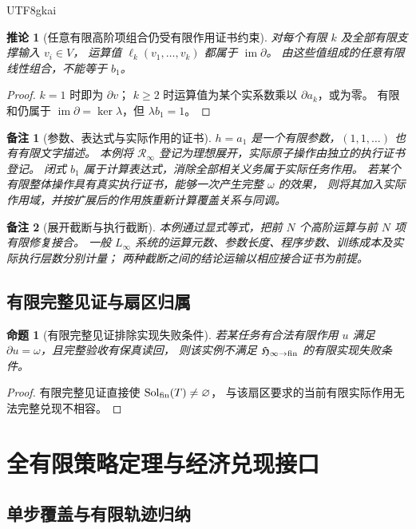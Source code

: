 \documentclass[12pt,a4paper,openany]{report}
\newtheorem{proposition}{命题}[chapter]
\newtheorem{corollary}{推论}[chapter]
\newtheorem{remark}{备注}[chapter]
\numberwithin{equation}{chapter}
\newcommand{\Linfty}{L_\infty}
\newcommand{\im}{\operatorname{im}}
\newcommand{\Sol}{\operatorname{Sol}}
\begin{document}
\begin{CJK*}{UTF8}{gkai}
\begin{corollary}[任意有限高阶项组合仍受有限作用证书约束]
对每个有限 $k$ 及全部有限支撑输入 $v_i\in V$，
运算值 $\ell_k(v_1,\ldots,v_k)$ 都属于 $\im\partial$。
由这些值组成的任意有限线性组合，不能等于 $b_1$。
\end{corollary}
\begin{proof}
$k=1$ 时即为 $\partial v$；
$k\ge2$ 时运算值为某个实系数乘以 $\partial a_k$，或为零。
有限和仍属于 $\im\partial=\ker\lambda$，但 $\lambda b_1=1$。
\end{proof}

\begin{remark}[参数、表达式与实际作用的证书]
$h=a_1$ 是一个有限参数，$(1,1,\ldots)$ 也有有限文字描述。
本例将 $\mathcal R_\infty$ 登记为理想展开，实际原子操作由独立的执行证书登记。
闭式 $b_1$ 属于计算表达式，消除全部相关义务属于实际任务作用。
若某个有限整体操作具有真实执行证书，能够一次产生完整 $\omega$ 的效果，
则将其加入实际作用域，并按扩展后的作用族重新计算覆盖关系与同调。
\end{remark}

\begin{remark}[展开截断与执行截断]
本例通过显式等式，把前 $N$ 个高阶运算与前 $N$ 项有限修复接合。
一般 $\Linfty$ 系统的运算元数、参数长度、程序步数、训练成本及实际执行层数分别计量；
两种截断之间的结论运输以相应接合证书为前提。
\end{remark}

\section{有限完整见证与扇区归属}

\begin{proposition}[有限完整见证排除实现失败条件]
若某任务有合法有限作用 $u$ 满足 $\partial u=\omega$，且完整验收有保真读回，
则该实例不满足 $\mathfrak H_{\infty\to{\rm fin}}$ 的有限实现失败条件。
\end{proposition}
\begin{proof}
有限完整见证直接使 $\Sol_{\rm fin}(T)\ne\varnothing$，
与该扇区要求的当前有限实际作用无法完整兑现不相容。
\end{proof}

\chapter{全有限策略定理与经济兑现接口}
\label{chap:total}

\section{单步覆盖与有限轨迹归纳}


\end{CJK*}
\end{document}
